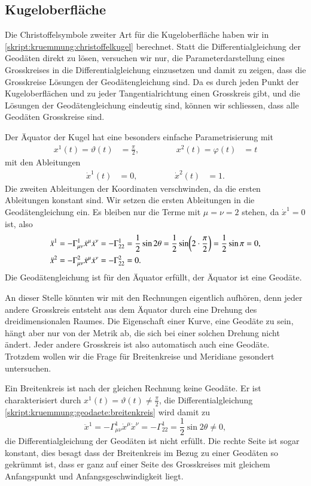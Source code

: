 \subsection{Kugeloberfläche}
Die Christoffelsymbole zweiter Art für die Kugeloberfläche haben wir
in \eqref{skript:kruemmung:christoffelkugel} berechnet.
Statt die Differentialgleichung der Geodäten direkt zu lösen, versuchen
wir nur, die Parameterdarstellung eines Grosskreises in die
Differentialgleichung einzusetzen und damit zu zeigen, dass die
Grosskreise Lösungen der Geodätengleichung sind.
Da es durch jeden Punkt der Kugeloberflächen und zu jeder Tangentialrichtung
einen Grosskreis gibt, und die Lösungen der Geodätengleichung eindeutig
sind, können wir schliessen, dass alle Geodäten Grosskreise sind.

Der Äquator der Kugel hat eine besonders einfache Parametrisierung mit
\[
\begin{aligned}
x^1(t)=\vartheta(t)&=\frac{\pi}2,
&\qquad&&
x^2(t)=\varphi(t)&=t
\end{aligned}
\]
mit den Ableitungen
\[
\begin{aligned}
\dot x^1(t)&=0,
&\qquad&&
\dot x^2(t)&=1.
\end{aligned}
\]
Die zweiten Ableitungen der Koordinaten verschwinden, da die ersten
Ableitungen konstant sind.
Wir setzen die ersten Ableitungen in die Geodätengleichung ein.
Es bleiben nur die Terme mit $\mu=\nu=2$ stehen, da $\dot x^1=0$ ist,
also
\begin{align}
\ddot x^1
&=
-\Gamma_{\mu\nu}^1\dot x^\mu\dot x^\nu
=
-\Gamma_{22}^1=\frac12\sin2\theta
=
\frac12\sin\biggl( 2\cdot\frac{\pi}2\biggr)
=
\frac12\sin\pi
=
0,
\label{skript:kruemmung:geodaete:breitenkreis}
\\
\ddot x^2
&=
-\Gamma_{\mu\nu}^2\dot x^\mu\dot x^\nu
=
-\Gamma_{22}^2=0.
\notag
\end{align}
Die Geodätengleichung ist für den Äquator erfüllt, der Äquator ist
eine Geodäte.

An dieser Stelle könnten wir mit den Rechnungen eigentlich aufhören, 
denn jeder andere Grosskreis entsteht aus dem Äquator durch eine
Drehung des dreidimensionalen Raumes.
Die Eigenschaft einer Kurve, eine Geodäte zu sein, hängt aber nur von
der Metrik ab, die sich bei einer solchen Drehung nicht ändert.
Jeder andere Grosskreis ist also automatisch auch eine Geodäte.
Trotzdem wollen wir die Frage für Breitenkreise und Meridiane
gesondert untersuchen.

Ein Breitenkreis ist nach der gleichen Rechnung keine Geodäte.
Er ist charakterisiert durch $x^1(t)=\vartheta(t)\ne\frac{\pi}2$,
die Differentialgleichung
\eqref{skript:kruemmung:geodaete:breitenkreis}
wird damit zu
\[
\ddot x^1
=
-\Gamma_{\mu\nu}^1\dot x^\mu\dot x^\nu
=
-\Gamma_{22}^1
=
\frac12\sin2\theta
\ne
0,
\]
die Differentialgleichung der Geodäten ist nicht erfüllt.
Die rechte Seite ist sogar konstant, dies besagt dass der Breitenkreis
im Bezug zu einer Geodäten so gekrümmt ist, dass er ganz
auf einer Seite des Grosskreises mit gleichem Anfangspunkt und
Anfangsgeschwindigkeit liegt.

